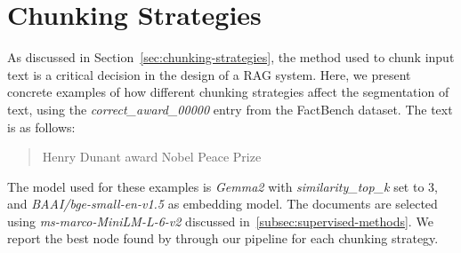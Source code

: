 \chapter{Chunking Strategies}\label{ch:chunking}
As discussed in Section~\ref{sec:chunking-strategies}, the method used to chunk input text is a critical decision in the design of a \ac{RAG} system.
Here, we present concrete examples of how different chunking strategies affect the segmentation of text, using the \textit{correct\_award\_00000} entry from the FactBench dataset.
The text is as follows:
\begin{quote}
    Henry Dunant award Nobel Peace Prize
\end{quote}
The model used for these examples is \textit{Gemma2} with \textit{similarity\_top\_k} set to 3, and \textit{BAAI/bge-small-en-v1.5} as embedding model.
The documents are selected using \textit{ms-marco-MiniLM-L-6-v2} discussed in~\ref{subsec:supervised-methods}.
We report the best node found by through our pipeline for each chunking strategy.

